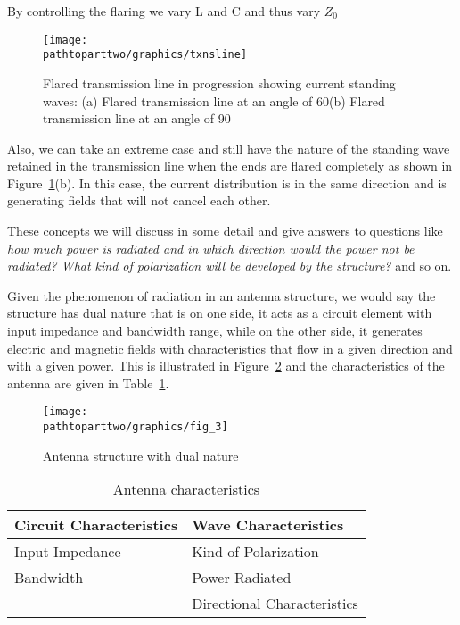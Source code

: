 By controlling the flaring we vary L and C and thus vary $Z_0$
\begin{figure}[h]
\centering
\texttt{[image: \\pathtoparttwo/graphics/txnsline]}
\caption{Flared transmission line in progression showing current standing waves: (a) Flared transmission line at an angle of 60\textdegree (b) Flared transmission line at an angle of 90\textdegree}
\label{fig:flaredtxnsline}
\end{figure}

Also, we can take an extreme case and still have the nature of the standing wave retained in the transmission line when the ends are flared completely as shown in Figure~\ref{fig:flaredtxnsline}(b). In this case, the current distribution is in the same direction and is generating fields that will not cancel each other.

These concepts we will discuss in some detail and give answers to questions like \emph{how much power is radiated and in which direction would the power not be radiated? What kind of polarization will be developed by the structure?} and so on.

Given the phenomenon of radiation in an antenna structure, we would say the structure has dual nature that is on one side, it acts as a circuit element with input impedance and bandwidth range, while on the other side, it generates electric and magnetic fields with characteristics that flow in a given direction and with a given power. This is illustrated in Figure~\ref{fig:antennadualnature} and the characteristics of the antenna are given in Table~\ref{tab:antennachar}.
\begin{figure}[h]
\centering
\texttt{[image: \\pathtoparttwo/graphics/fig\_3]}
\caption{Antenna structure with dual nature}
\label{fig:antennadualnature}
\end{figure}
\begin{table}[h]
\centering
\caption{Antenna characteristics}
\begin{tabular}{|l|l|}
\hline
\textbf{Circuit Characteristics} & \textbf{Wave Characteristics} \\
\hline
Input Impedance & Kind of Polarization \\
\hline
Bandwidth & Power Radiated \\
\hline
  & Directional Characteristics \\
\hline
\end{tabular}
\label{tab:antennachar}
\end{table}

